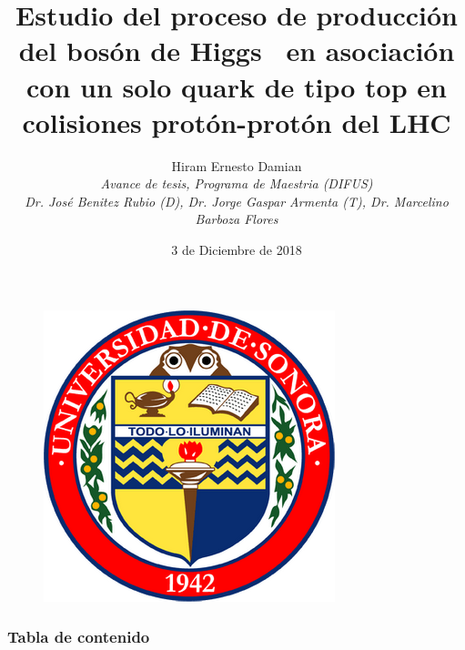 \documentclass[11pt]{beamer}
\begin{document}
\author{Hiram Ernesto Damian \\
\textit{Avance de tesis, Programa de Maestria (DIFUS)\\ 
	Dr. José Benitez Rubio (D), Dr. Jorge Gaspar Armenta (T), Dr. Marcelino Barboza Flores}}
\title{Estudio del proceso de producción del bosón de Higgs  en asociación con un solo quark de tipo top en colisiones protón-protón del LHC} 

	\date{3 de Diciembre de 2018}
	\begin{frame}[plain]
	\maketitle
	\begin{center}
		\begin{figure}
		\includegraphics[scale=0.18]{unison-logo.png}
		\end{figure}
	\end{center} 
\end{frame}
\begin{frame}
\frametitle{Tabla de contenido}
\tableofcontents
\end{frame}
\end{document}
